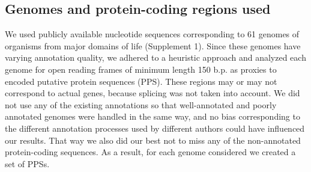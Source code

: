 \subsection{Genomes and protein-coding regions used}
We used publicly available nucleotide sequences corresponding to 61 genomes of
organisms from major domains of life (Supplement 1). Since these genomes have
varying annotation quality, we adhered to a heuristic approach and analyzed
each genome for open reading frames of minimum length 150 b.p. as proxies to
encoded putative protein sequences (PPS). These regions may or may not
correspond to actual genes, because splicing was not taken into account. We did
not use any of the existing annotations so that well-annotated and poorly
annotated genomes were handled in the same way, and no bias corresponding to
the different annotation processes used by different authors could have
influenced our results. That way we also did our best not to miss any of the
non-annotated protein-coding sequences. As a result, for each genome considered
we created a set of PPSs.
